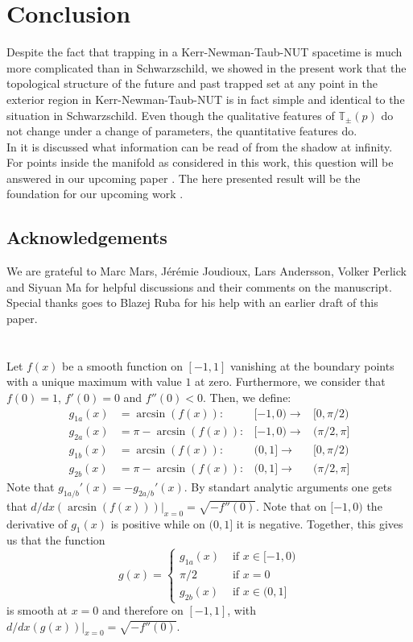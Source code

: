 \documentclass[reqno]{amsart}
\numberwithin{equation}{section}
\theoremstyle{plain}
\theoremstyle{definition}
\begin{document}
\section{Conclusion}
Despite the fact that trapping in a Kerr-Newman-Taub-NUT spacetime is much more complicated than in Schwarzschild, we showed in the present work that the topological structure of the future and past trapped set at any point in the exterior region in Kerr-Newman-Taub-NUT is in fact simple and identical to the situation in Schwarzschild. Even though the qualitative features of $\mathbb{T}_\pm(p)$ do not change under a change of parameters, the quantitative features do.\\
In \cite{hioki_measurement_2009,li_measuring_2014} it is discussed what information can be read of from the shadow at infinity. For points inside the manifold as considered in this work, this question will be answered in our upcoming paper \cite{shadows}. The here presented result will be the foundation for our upcoming work \cite{shadows}.

\subsection*{Acknowledgements} We are grateful to Marc Mars, J\'er\'emie Joudioux,  Lars Andersson, Volker Perlick and Siyuan Ma for helpful discussions and their comments on the manuscript. Special thanks goes to Blazej Ruba for his help with an earlier draft of this paper. 
\appendix
\section{}\label{app:A}
Let $f(x)$ be a smooth function on $[-1,1]$ vanishing at the boundary points with a unique maximum with value $1$ at zero. Furthermore, we consider that $f(0)=1$, $f'(0)=0$ and $f''(0)<0$. Then, we define:
\begin{align}
g_{1a}(x)&=\arcsin(f(x)): & [-1,0)\rightarrow&[0,\pi/2)\\
g_{2a}(x)&=\pi-\arcsin(f(x)):& [-1,0)\rightarrow&(\pi/2,\pi]\\
g_{1b}(x)&=\arcsin(f(x)):& (0,1]\rightarrow&[0,\pi/2)\\
g_{2b}(x)&=\pi-\arcsin(f(x)):& (0,1]\rightarrow&(\pi/2,\pi]
\end{align}
Note that $g_{1a/b}'(x)=-g_{2a/b}'(x)$. By standart analytic arguments one gets that $d/dx (\arcsin(f(x)))|_{x=0}= \sqrt{-f''(0)}$. Note that on $[-1,0)$ the derivative of $g_1(x)$ is positive while on $(0,1]$ it is negative. Together, this gives us that the function
\begin{equation}
    g(x)=\begin{cases}
    g_{1a}(x)& \text{ if } x\in [-1,0)\\
    \pi/2&  \text{ if } x=0\\
    g_{2b}(x)&  \text{ if } x\in (0,1]
    \end{cases}
\end{equation}
is smooth at $x=0$ and therefore on $[-1,1]$, with $d/dx(g(x))|_{x=0}=\sqrt{-f''(0)}$. 
\end{document}
